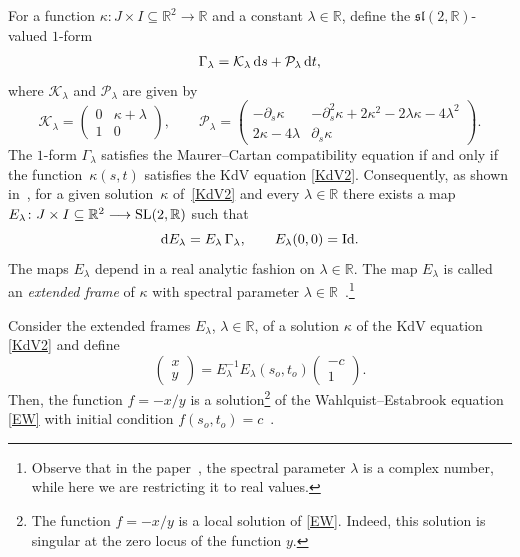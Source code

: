 \documentclass[10pt,a4paper]{amsart}
\numberwithin{equation}{section}
\def\bending{\kappa}
\def\R{\mathbb{R}}
\def\SL{{\rm SL}(2,\R)}
\begin{document}
For a function $\bending\colon J\times I\subseteq\R^2\longrightarrow\R$ and a constant $\lambda\in\R$, define the $\mathfrak{sl}(2,\R)$-valued $1$-form
\begin{equation}\label{alpha}
	\Gamma_{\lambda}=\mathcal{K}_\lambda\,{\rm d}s+\mathcal{P}_\lambda\,{\rm d}t,
\end{equation}
where $\mathcal{K}_\lambda$ and $\mathcal{P}_\lambda$ are given by
\begin{equation}\label{KP}
	\mathcal{K}_\lambda=\begin{pmatrix} 0 & \bending+\lambda \\ 1 & 0\end{pmatrix}, \qquad \mathcal{P}_\lambda=\begin{pmatrix} -\partial_s\bending & -\partial_s^2\bending+2\bending^2-2\lambda\bending-4\lambda^2 \\ 2\bending-4\lambda & \partial_s\bending \end{pmatrix}.
\end{equation}
The $1$-form $\Gamma_{\lambda}$ satisfies the Maurer--Cartan compatibility equation if and only if the function~$\bending(s,t)$ satisfies the KdV equation \eqref{KdV2}. Consequently, as shown in~\cite{ZF}, for a given solution~$\bending$ of~\eqref{KdV2} and every $\lambda\in\R$ there exists a map $E_\lambda\colon J\times I\subseteq\R^2\longrightarrow\SL$ such that%
\begin{equation}\label{dE}
	{\rm d}E_\lambda=E_\lambda\,\Gamma_{\lambda},\qquad E_\lambda(0,0)={\rm Id}.
\end{equation}
The maps $E_\lambda$ depend in a real analytic fashion on $\lambda\in\R$. The map $E_\lambda$ is called an \emph{extended frame} of $\bending$ with spectral parameter $\lambda\in\R$~\cite{TU}.\footnote{Observe that in the paper~\cite{TU}, the spectral parameter $\lambda$ is a complex number, while here we are restricting it to real values.}

Consider the extended frames $E_\lambda$, $\lambda\in\R$, of a solution $\bending$ of the KdV equation \eqref{KdV2} and define\begin{equation}\label{TF}
	\begin{pmatrix} x \\ y \end{pmatrix}=E_\lambda^{-1}E_\lambda(s_o,t_o)\begin{pmatrix} -c \\ 1 \end{pmatrix}.
\end{equation}
Then, the function $f=-x/y$ is a solution\footnote{The function $f=-x/y$ is a local solution of \eqref{EW}. Indeed, this solution is singular at the zero locus of the function $y$.} of the Wahlquist--Estabrook equation \eqref{EW} with initial condition $f(s_o,t_o)=c$~\cite{TU}.
\end{document}
